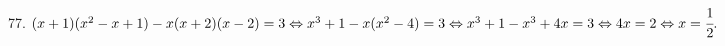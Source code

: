 77. $(x+1)(x^2-x+1)-x(x+2)(x-2)=3\Leftrightarrow x^3+1-x(x^2-4)=3\Leftrightarrow
x^3+1-x^3+4x=3\Leftrightarrow4x=2\Leftrightarrow x=\cfrac{1}{2}.$\\
